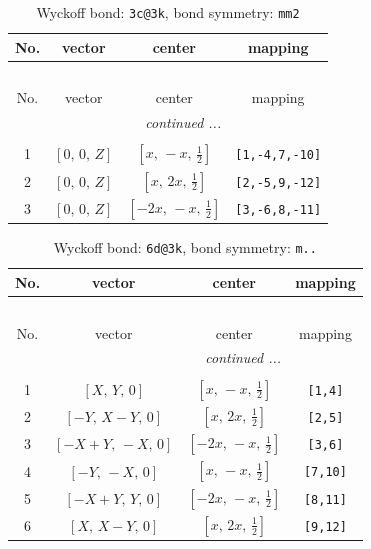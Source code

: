 \documentclass[fleqn,8pt]{jsarticle}
\begin{document}
\renewcommand{\arraystretch}{1.2}
\begin{longtable}{cccc}
\caption{Wyckoff bond: {\tt 3c@3k}, bond symmetry: {\tt mm2}}
 \\
 \hline \hline
No. & vector & center & mapping \\ \hline \endfirsthead

\multicolumn{3}{l}{\tablename\ \thetable{}} \\
 \hline \hline
No. & vector & center & mapping \\ \hline \endhead

 \hline \hline
\multicolumn{3}{r}{\footnotesize\it continued ...} \\ \endfoot

 \hline \hline
\multicolumn{3}{r}{} \\ \endlastfoot

1 & $\left[ 0,\, 0,\, Z \right]$ & $\left[ x,\, - x,\, \frac{1}{2} \right]$ & {\tt [1,-4,7,-10]} \\ \hline
2 & $\left[ 0,\, 0,\, Z \right]$ & $\left[ x,\, 2 x,\, \frac{1}{2} \right]$ & {\tt [2,-5,9,-12]} \\ \hline
3 & $\left[ 0,\, 0,\, Z \right]$ & $\left[ - 2 x,\, - x,\, \frac{1}{2} \right]$ & {\tt [3,-6,8,-11]} \\
\end{longtable}
\renewcommand{\arraystretch}{1.2}
\begin{longtable}{cccc}
\caption{Wyckoff bond: {\tt 6d@3k}, bond symmetry: {\tt m..}}
 \\
 \hline \hline
No. & vector & center & mapping \\ \hline \endfirsthead

\multicolumn{3}{l}{\tablename\ \thetable{}} \\
 \hline \hline
No. & vector & center & mapping \\ \hline \endhead

 \hline \hline
\multicolumn{3}{r}{\footnotesize\it continued ...} \\ \endfoot

 \hline \hline
\multicolumn{3}{r}{} \\ \endlastfoot

1 & $\left[ X,\, Y,\, 0 \right]$ & $\left[ x,\, - x,\, \frac{1}{2} \right]$ & {\tt [1,4]} \\ \hline
2 & $\left[ - Y,\, X - Y,\, 0 \right]$ & $\left[ x,\, 2 x,\, \frac{1}{2} \right]$ & {\tt [2,5]} \\ \hline
3 & $\left[ - X + Y,\, - X,\, 0 \right]$ & $\left[ - 2 x,\, - x,\, \frac{1}{2} \right]$ & {\tt [3,6]} \\ \hline
4 & $\left[ - Y,\, - X,\, 0 \right]$ & $\left[ x,\, - x,\, \frac{1}{2} \right]$ & {\tt [7,10]} \\ \hline
5 & $\left[ - X + Y,\, Y,\, 0 \right]$ & $\left[ - 2 x,\, - x,\, \frac{1}{2} \right]$ & {\tt [8,11]} \\ \hline
6 & $\left[ X,\, X - Y,\, 0 \right]$ & $\left[ x,\, 2 x,\, \frac{1}{2} \right]$ & {\tt [9,12]} \\
\end{longtable}
\end{document}
